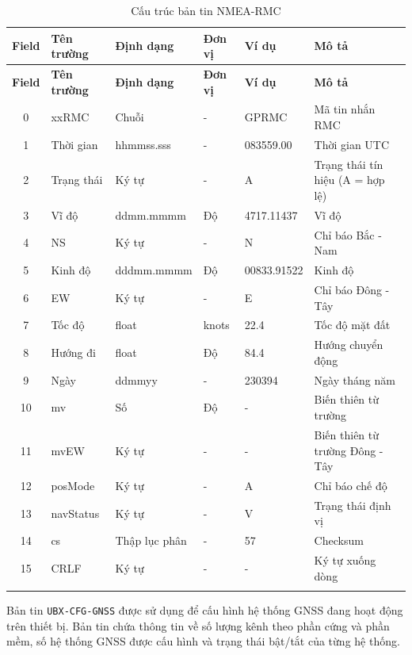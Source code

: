 \documentclass[../DoAn.tex]{subfiles}
\begin{document}
\begin{longtable}{|c|l|l|l|l|p{4cm}|}
\hline
\textbf{Field} & \textbf{Tên trường} & \textbf{Định dạng} & \textbf{Đơn vị} & \textbf{Ví dụ} & \textbf{Mô tả} \\
\hline
\endfirsthead

\hline
\textbf{Field} & \textbf{Tên trường} & \textbf{Định dạng} & \textbf{Đơn vị} & \textbf{Ví dụ} & \textbf{Mô tả} \\
\hline
\endhead

\hline
\endfoot

\endlastfoot

0 & xxRMC & Chuỗi & - & GPRMC & Mã tin nhắn RMC \\ \hline
1 & Thời gian & hhmmss.sss & - & 083559.00 & Thời gian UTC \\ \hline
2 & Trạng thái & Ký tự & - & A & Trạng thái tín hiệu (A = hợp lệ) \\ \hline
3 & Vĩ độ & ddmm.mmmm & Độ & 4717.11437 & Vĩ độ \\ \hline
4 & NS & Ký tự & - & N & Chỉ báo Bắc - Nam \\ \hline
5 & Kinh độ & dddmm.mmmm & Độ & 00833.91522 & Kinh độ \\ \hline
6 & EW & Ký tự & - & E & Chỉ báo Đông - Tây \\ \hline
7 & Tốc độ & float & knots & 22.4 & Tốc độ mặt đất \\ \hline
8 & Hướng đi & float & Độ & 84.4 & Hướng chuyển động \\ \hline
9 & Ngày & ddmmyy & - & 230394 & Ngày tháng năm \\ \hline
10 & mv & Số & Độ & - & Biến thiên từ trường \\ \hline
11 & mvEW & Ký tự & - & - & Biến thiên từ trường Đông - Tây \\ \hline
12 & posMode & Ký tự & - & A & Chỉ báo chế độ \\ \hline
13 & navStatus & Ký tự & - & V & Trạng thái định vị \\ \hline
14 & cs & Thập lục phân & - & 57 & Checksum \\ \hline
15 & CRLF & Ký tự & - & - & Ký tự xuống dòng \\ \hline

\caption{Cấu trúc bản tin NMEA-RMC} \\
\end{longtable}

Bản tin \texttt{UBX-CFG-GNSS} được sử dụng để cấu hình hệ thống GNSS đang hoạt động trên thiết bị. Bản tin chứa thông tin về số lượng kênh theo phần cứng và phần mềm, số hệ thống GNSS được cấu hình và trạng thái bật/tắt của từng hệ thống.
\end{document}
